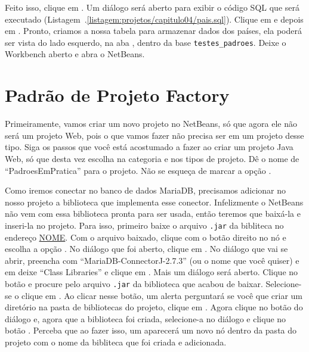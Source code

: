 Feito isso, clique em . Um diálogo será aberto para exibir o código SQL que será executado (Listagem~\thechapter.\ref{listagem:projetos/capitulo04/pais.sql}). Clique em  e depois em . Pronto, criamos a nossa tabela para armazenar dados dos países, ela poderá ser vista do lado esquerdo, na aba , dentro da base \texttt{testes\_padroes}. Deixe o Workbench aberto e abra o NetBeans. 


\section{Padrão de Projeto Factory}

Primeiramente, vamos criar um novo projeto no NetBeans, só que agora ele não será um projeto Web, pois o que vamos fazer não precisa ser em um projeto desse tipo. Siga os passos que você está acostumado a fazer ao criar um projeto Java Web, só que desta vez escolha  na categoria e  nos tipos de projeto. Dê o nome de ``PadroesEmPratica'' para o projeto. Não se esqueça de marcar a opção .

Como iremos conectar no banco de dados MariaDB, precisamos adicionar no nosso projeto a biblioteca que implementa esse conector. Infelizmente o NetBeans não vem com essa biblioteca pronta para ser usada, então teremos que baixá-la e inseri-la no projeto. Para isso, primeiro baixe o arquivo \texttt{.jar} da bibliteca no endereço \url{NOME}. Com o arquivo baixado, clique com o botão direito no nó  e escolha a opção . No diálogo que foi aberto, clique em . No diálogo que vai se abrir, preencha  com ``MariaDB-ConnectorJ-2.7.3'' (ou o nome que você quiser) e em  deixe ``Class Libraries'' e clique em . Mais um diálogo será aberto. Clique no botão  e procure pelo arquivo \texttt{.jar} da biblioteca que acabou de baixar. Selecione-se o clique em . Ao clicar nesse botão, um alerta perguntará se você que criar um diretório na pasta de bibliotecas do projeto, clique em . Agora clique no botão  do diálogo  e, agora que a biblioteca foi criada, selecione-a no diálogo  e clique no botão . Perceba que ao fazer isso, um aparecerá um novo nó dentro da pasta  do projeto com o nome da bibliteca que foi criada e adicionada.


